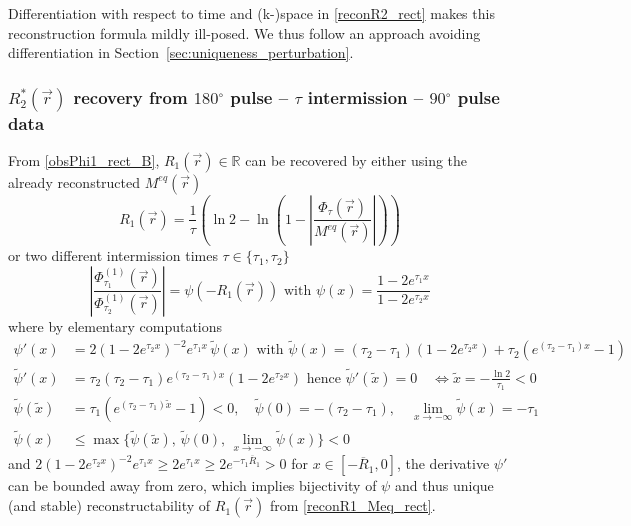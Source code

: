 \documentclass{ws-m3as}
\begin{document}
Differentiation with respect to time and (k-)space in \eqref{reconR2_rect} makes this reconstruction formula mildly ill-posed. We thus follow an approach avoiding differentiation in Section~\ref{sec:uniqueness_perturbation}.



\subsubsection*{$R_2^*(\vec r)$ recovery from $180{}^{\circ}$ pulse -- $\tau$ intermission -- $90{}^{\circ}$ pulse data}

From \eqref{obsPhi1_rect_B}, $R_1(\vec r)\in\mathbb{R}$ can be recovered by either using the already reconstructed $M^{eq}(\vec r)$ 
\begin{equation}\label{reconR1_Meq_rect}
R_1(\vec r)=\frac{1}{\tau}\left(\ln 2 -\ln\left(1-\left|\frac{\Phi_\tau(\vec r)}{M^{eq}(\vec r)}\right|\right)\right)
\end{equation}
or two different intermission times $\tau\in\{\tau_1,\tau_2\}$
\begin{equation}\label{reconR1_twotaus_rect}
\left|\frac{\Phi^{(1)}_{\tau_1}(\vec r)}{\Phi^{(1)}_{\tau_2}(\vec r)}\right|
=\psi(-R_1(\vec r))
\text{ with }\psi(x)=\frac{1-2e^{\tau_1 x}}{1-2e^{\tau_2 x}}
\end{equation}
where by elementary computations 
\begin{equation}\label{psiprime}
\begin{aligned}
\psi'(x)&=2(1-2e^{\tau_2 x})^{-2} e^{\tau_1 x}\, \tilde{\psi}(x)\text{ with }
\tilde{\psi}(x)=(\tau_2-\tau_1) (1-2e^{\tau_2 x})+\tau_2(e^{(\tau_2-\tau_1) x}-1)\\
\tilde{\psi}'(x)&=\tau_2(\tau_2-\tau_1)e^{(\tau_2-\tau_1) x}(1-2e^{\tau_2 x})\text{ hence }
\tilde{\psi}'(\tilde{x})=0 \quad \Leftrightarrow \tilde{x}=-\frac{\ln2}{\tau_1}<0\\
\tilde{\psi}(\tilde{x})&=\tau_1(e^{(\tau_2-\tau_1) \tilde{x}}-1)<0
, \quad \tilde{\psi}(0)=-(\tau_2-\tau_1), \quad \lim_{x\to-\infty}\tilde{\psi}(x)= -\tau_1\\
\tilde{\psi}(x)&\leq\max\{\tilde{\psi}(\tilde{x}),\,\tilde{\psi}(0),\,\lim_{x\to-\infty}\tilde{\psi}(x)\}<0
\end{aligned}
\end{equation}
and $2(1-2e^{\tau_2 x})^{-2} e^{\tau_1 x}\geq 2e^{\tau_1 x}\geq 2e^{-\tau_1 \overline{R}_1}>0$ for $x\in[-\overline{R}_1,0]$, 
the derivative $\psi'$ can be bounded away from zero,
which implies bijectivity of $\psi$ and thus unique (and stable) reconstructability of $R_1(\vec r)$ from \eqref{reconR1_Meq_rect}.
\end{document}
